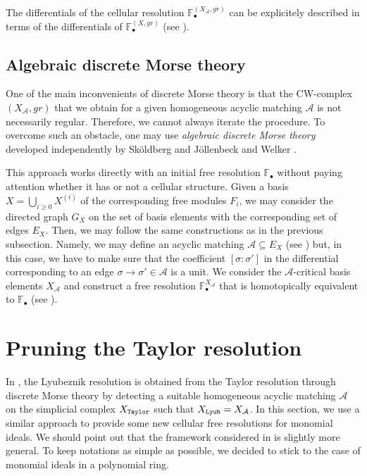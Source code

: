 \documentclass[12pt]{amsart}
\theoremstyle{definition}
\theoremstyle{remark}
\numberwithin{equation}{section}
\newcommand{\cA}{{\mathcal A}}
\newcommand{\lra}{{\longrightarrow}}
\begin{document}
\vskip 2mm

The differentials of the cellular resolution
$\mathbb{F}_{\bullet}^{(X_{\cA},gr)}$ can be explicitely described
in terms of the  differentials of $\mathbb{F}_{\bullet}^{(X,gr)}$
(see \cite[Lemma 7.7]{BW}).

\subsection{Algebraic discrete Morse theory}

One of the main inconvenients of discrete Morse theory %
is that the CW-complex $(X_{\cA},gr)$ that we obtain for a given homogeneous acyclic matching $\cA$
is not necessarily regular. Therefore, we cannot always iterate the procedure.
To overcome such an obstacle, one may use {\it algebraic discrete Morse theory} developed independently by
 Sk\"oldberg \cite{Sko} and J\"ollenbeck and Welker \cite{JW}.


 \vskip 2mm

This approach works directly with an initial free resolution $\mathbb{F}_{\bullet}$
without paying attention whether it has or not a cellular structure.
Given a basis $X=\bigcup_{i\geq 0} X^{(i)}$ of the corresponding free modules $F_i$,
we may consider the directed graph $G_X$ on the set of basis elements with the corresponding
set of edges $E_X$. Then, we may follow the same constructions as in the previous subsection.
Namely, we may define an acyclic matching $\cA \subseteq E_X$ (see \cite[Definition 2.1]{JW})
but, in this case, we have to make sure that the coefficient $[\sigma : \sigma']$ in the differential
corresponding to an edge $\sigma \lra \sigma' \in \cA$ is a unit. We consider the $\cA$-critical
basis elements $X_\cA$ and construct a free resolution $\mathbb{F}_{\bullet}^{X_\cA}$ that is
homotopically equivalent to $\mathbb{F}_{\bullet}$ (see \cite[Theorem 2.2]{JW}).


\section{Pruning the Taylor resolution} \label{prune}

In \cite{BW}, the Lyubeznik resolution is obtained  from the Taylor resolution through discrete Morse theory
by detecting a suitable homogeneous acyclic matching $\cA$ on the simplicial complex $X_{\tt Taylor}$ such that $X_{\tt Lyub}=X_\cA$.
In this section, we use a similar approach to provide some new cellular free resolutions for
monomial ideals. We should point out that the framework considered in
\cite{BW} is slightly more general. To keep notations as simple as possible,
we decided to stick to the case of monomial ideals in a polynomial ring.
\end{document}
